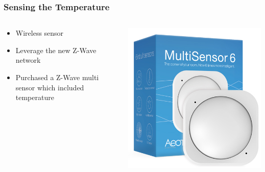 \documentclass[aspectratio=169,11pt,hyperref={colorlinks=true}]{beamer}
\begin{document}
\begin{frame}
    \frametitle{Sensing the Temperature}
    \begin{columns}
        \begin{column}{.48\textwidth}
            \begin{itemize}
                \item Wireless sensor
                \item Leverage the new Z-Wave network
                \item Purchased a Z-Wave multi sensor which included temperature
            \end{itemize}
        \end{column}
        \begin{column}{.48\textwidth}
            \includegraphics[width=\textwidth]{aeotec-multi.jpg}
        \end{column}
    \end{columns}
\end{frame}
\end{document}
